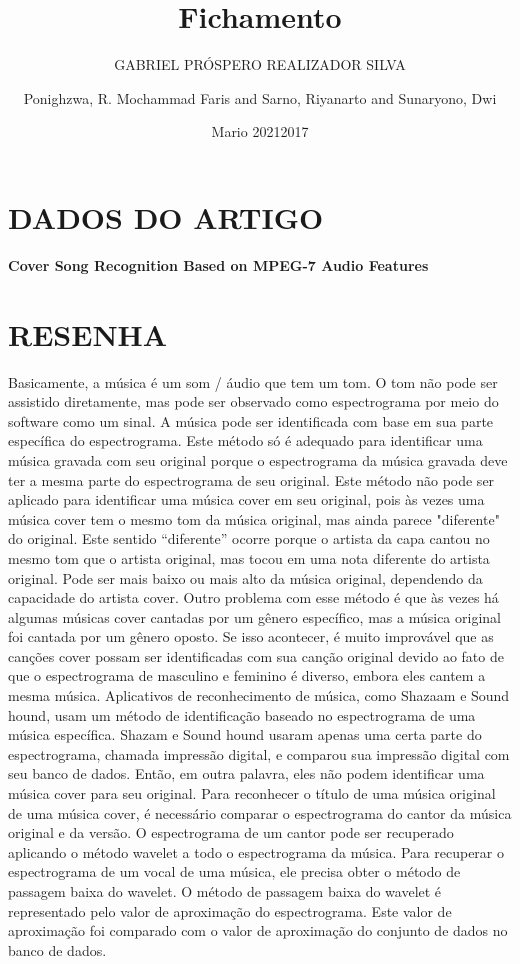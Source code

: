 \documentclass{article}
\title{Fichamento}
\author{GABRIEL PRÓSPERO REALIZADOR  SILVA}
\date{Mario 2021}
\begin{document}
\maketitle

\section{DADOS DO ARTIGO}
\textbf{Cover Song Recognition Based on MPEG-7 Audio Features \\}
\author{Ponighzwa, R. Mochammad Faris and Sarno, Riyanarto and Sunaryono, Dwi \\}
\date{2017}

\section{RESENHA}Basicamente, a música é um som / áudio que tem um tom. O tom não pode ser assistido diretamente, mas pode ser observado como espectrograma por meio do software como um sinal. A música pode ser identificada com base em sua parte específica do espectrograma. Este método só é adequado para identificar uma música gravada com seu original porque o espectrograma da música gravada deve ter a mesma parte do espectrograma de seu original. Este método não pode ser aplicado para identificar uma música cover em seu original, pois às vezes uma música cover tem o mesmo tom da música original, mas ainda parece "diferente" do original. Este sentido “diferente” ocorre porque o artista da capa cantou no mesmo tom que o artista original, mas tocou em uma nota diferente do artista original. Pode ser mais baixo ou mais alto da música original, dependendo da capacidade do artista cover. Outro problema com esse método é que às vezes há algumas músicas cover cantadas por um gênero específico, mas a música original foi cantada por um gênero oposto. Se isso acontecer, é muito improvável que as canções cover possam ser identificadas com sua canção original devido ao fato de que o espectrograma de masculino e feminino é diverso, embora eles cantem a mesma música. Aplicativos de reconhecimento de música, como Shazaam e Sound hound, usam um método de identificação baseado no espectrograma de uma música específica. Shazam e Sound hound usaram apenas uma certa parte do espectrograma, chamada impressão digital, e comparou sua impressão digital com seu banco de dados. Então, em outra palavra, eles não podem identificar uma música cover para seu original.
Para reconhecer o título de uma música original de uma música cover, é necessário comparar o espectrograma do cantor da música original e da versão. O espectrograma de um cantor pode ser recuperado aplicando o método wavelet a todo o espectrograma da música. Para recuperar o espectrograma de um vocal de uma música, ele precisa obter o método de passagem baixa do wavelet. O método de passagem baixa do wavelet é representado pelo valor de aproximação do espectrograma. Este valor de aproximação foi comparado com o valor de aproximação do conjunto de dados no banco de dados.
\end{document}

